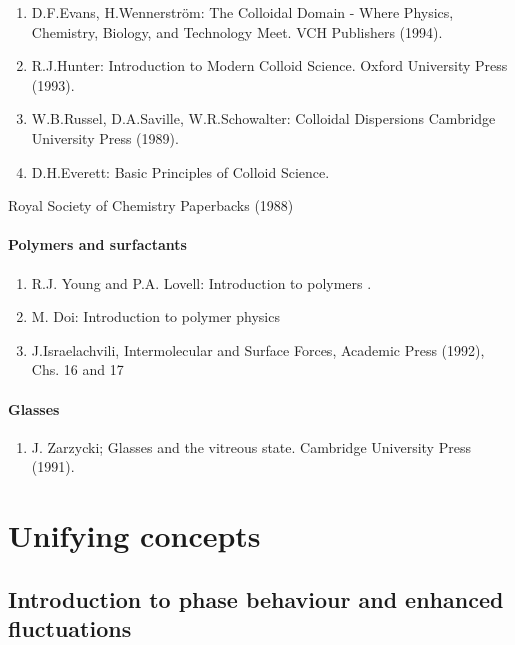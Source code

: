 \documentclass[
  letterpaper,
  enabledeprecatedfontcommands]{report}
\providecommand{\tightlist}{%
  \setlength{\itemsep}{0pt}\setlength{\parskip}{0pt}}
\begin{document}
\begin{enumerate}
\def\labelenumi{(\arabic{enumi})}
\tightlist
\item
  D.F.Evans, H.Wennerström: The Colloidal Domain - Where Physics,
  Chemistry, Biology, and Technology Meet. VCH Publishers (1994).
\item
  R.J.Hunter: Introduction to Modern Colloid Science. Oxford University
  Press (1993).
\item
  W.B.Russel, D.A.Saville, W.R.Schowalter: Colloidal Dispersions
  Cambridge University Press (1989).
\item
  D.H.Everett: Basic Principles of Colloid Science.
\end{enumerate}

Royal Society of Chemistry Paperbacks (1988)

\subsection*{Polymers and surfactants}\label{polymers-and-surfactants}

\begin{enumerate}
\def\labelenumi{(\arabic{enumi})}
\tightlist
\item
  R.J. Young and P.A. Lovell: Introduction to polymers .
\item
  M. Doi: Introduction to polymer physics
\item
  J.Israelachvili, Intermolecular and Surface Forces, Academic Press
  (1992), Chs. 16 and 17
\end{enumerate}

\subsection*{Glasses}\label{glasses}

\begin{enumerate}
\def\labelenumi{(\arabic{enumi})}
\tightlist
\item
  J. Zarzycki; Glasses and the vitreous state. Cambridge University
  Press (1991).
\end{enumerate}

\part{Unifying concepts}

\chapter{Introduction to phase behaviour and enhanced
fluctuations}\label{introduction-to-phase-behaviour-and-enhanced-fluctuations}
\end{document}

